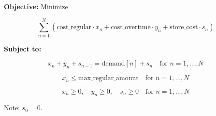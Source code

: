 \documentclass{article}
\begin{document}
\textbf{Objective:} Minimize 

\[
\sum_{n=1}^{N} \left( \text{cost\_regular} \cdot x_n + \text{cost\_overtime} \cdot y_n + \text{store\_cost} \cdot s_n \right)
\]

\textbf{Subject to:}

\[
x_n + y_n + s_{n-1} = \text{demand}[n] + s_n \quad \text{for } n = 1, \ldots, N
\]

\[
x_n \leq \text{max\_regular\_amount} \quad \text{for } n = 1, \ldots, N
\]

\[
x_n \geq 0, \quad y_n \geq 0, \quad s_n \geq 0 \quad \text{for } n = 1, \ldots, N
\]

Note: \( s_0 = 0 \).
\end{document}
